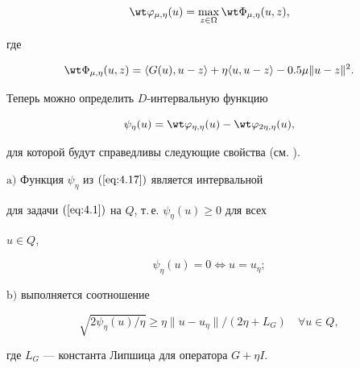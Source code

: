 \begin{equation} \label{eq:4.16} 


\wt\varphi_{\mu, \eta} (u)=\max_{z \in \Omega} \wt \Phi_ {\mu, \eta} (u,z), 


\end{equation}


где


$$


\wt\Phi_{\mu,\eta}(u,z)=\langle G(u),u-z \rangle+\eta\langle u, u-z \rangle -


0.5 \mu \| u-z \|^2.


$$


Теперь можно определить $D$-интервальную функцию


\begin{equation} \label{eq:4.17} 


\psi_{\eta}(u)=\wt\varphi_{\eta, \eta} (u) - \wt \varphi_{2\eta , \eta} (u), 


\end{equation}


для которой будут справедливы следующие свойства (см. \cite{Kon99}).





\begin{prop} \label{pro:4.4}


$\mathrm{a)}$ Функция $\psi_{\eta}$ из $(\ref{eq:4.17})$ является интервальной


для задачи $(\ref{eq:4.1})$ на $Q$, т.\,е. $\psi_{\eta}(u) \geq 0$ для всех


$u \in Q$,


$$


\psi_{\eta} (u)=0 \Longleftrightarrow u=u_{\eta};


$$





$\mathrm{b)}$ выполняется соотношение 


\begin{equation} \label{eq:4.18} 


\sqrt{2 \psi_{\eta}(u)/\eta}\ge\eta\|u-u_{\eta}\|/(2\eta+L_{G})


\quad \forall u \in Q, 


\end{equation}


где $L_{G}$ --- константа Липшица для оператора $G+\eta I$.


\end{prop}





